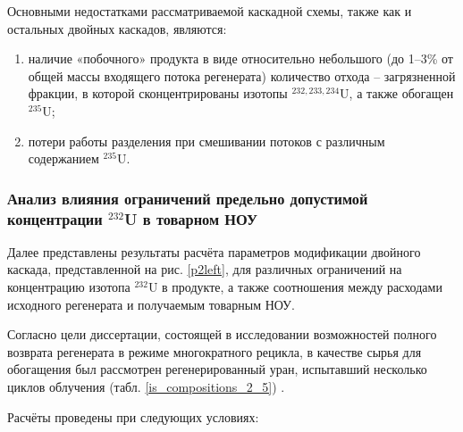 Основными недостатками рассматриваемой каскадной схемы, также как и остальных двойных каскадов, являются: 
\begin{enumerate}
    \item наличие «побочного» продукта в виде относительно небольшого (до 1–3\% от общей массы входящего потока регенерата) количество отхода -- загрязненной фракции, в которой сконцентрированы изотопы $^{232,233,234}$U, а также обогащен $^{235}$U;
    \item потери работы разделения при смешивании потоков с различным содержанием  $^{235}$U.
\end{enumerate}


\subsubsection{Анализ влияния ограничений предельно допустимой концентрации $^{232}$U в товарном НОУ}

Далее представлены результаты расчёта параметров модификации двойного каскада, представленной на рис. \ref{p2left}, для различных ограничений на концентрацию изотопа $^{232}$U в продукте, а также соотношения между расходами исходного регенерата и получаемым товарным НОУ.

Согласно цели диссертации, состоящей в исследовании возможностей полного возврата регенерата в режиме многократного рецикла, в качестве сырья для обогащения был рассмотрен регенерированный уран, испытавший несколько циклов облучения (табл. \ref{is_compositions_2_5}) \cite{palkinDesignanalyticalResearchRefinement2010}.

Расчёты проведены при следующих условиях:

